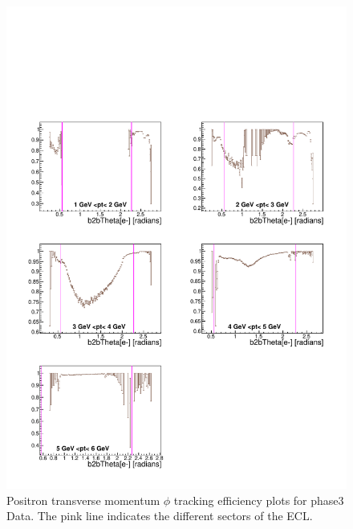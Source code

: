 \documentclass[a4paper,11pt,twosided,final,german,openbib,pdftex,listof=totoc,bibliography=totoc]{scrbook}
\begin{document}
\begin{appendix}
\begin{figure}[!htbp]
	\centering
	\includegraphics[width=\textwidth]{Plots/master3/xPtMThetaep_DataP3}
	\caption[Transverse Momentum $\theta$ Positron Efficiency Phase3 Data]{Positron transverse momentum $\phi$ tracking efficiency plots for phase3 Data. The pink line indicates the different sectors of the ECL.}
	\label{plt:PtMThetaep3_Data}
\end{figure}




\end{appendix}
\end{document}
